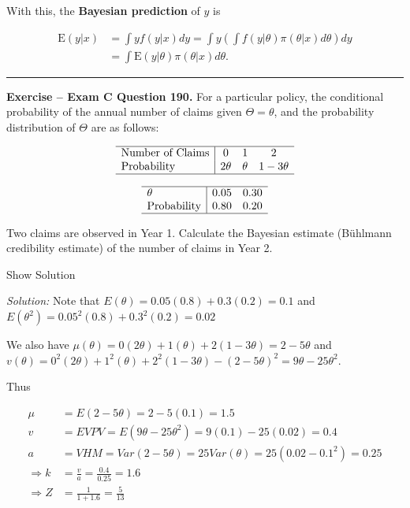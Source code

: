 \documentclass[]{book}
\theoremstyle{definition}
\theoremstyle{definition}
\theoremstyle{definition}
\theoremstyle{remark}
\begin{document}
With this, the \textbf{Bayesian prediction} of \(y\) is

\[\begin{aligned}
\mathrm{E}(y|x) &=  \int y f(y|x) dy = \int y \left(\int f(y|\theta) \pi(\theta|x) d\theta \right) dy \\
&=  \int  \mathrm{E}(y|\theta) \pi(\theta|x) d\theta .
\end{aligned}\]

\begin{center}\rule{0.5\linewidth}{\linethickness}\end{center}

\textbf{Exercise -- Exam C Question 190.} For a particular policy, the
conditional probability of the annual number of claims given
\(\Theta = \theta\), and the probability distribution of \(\Theta\) are
as follows:

\[\begin{array}{l|ccc}
\hline
\text{Number of Claims} & 0 & 1 & 2 \\
\text{Probability} & 2\theta & \theta & 1-3\theta \\
\hline
\end{array}\]

\[\begin{array}{l|cc}
\hline
\theta & 0.05 & 0.30 \\
\text{Probability} & 0.80 & 0.20 \\
\hline
\end{array}\]

Two claims are observed in Year 1. Calculate the Bayesian estimate
(Bühlmann credibility estimate) of the number of claims in Year 2.

Show Solution

\hypertarget{toggleExamC190}{}
\emph{Solution:} Note that \(E(\theta) = 0.05(0.8) + 0.3(0.2) = 0.1\)
and \(E(\theta^2) = 0.05^2(0.8) + 0.3^2(0.2)=0.02\)

We also have
\(\mu(\theta) = 0(2\theta) + 1(\theta) + 2(1-3\theta) = 2-5\theta\) and
\(v(\theta) = 0^2(2\theta) + 1^2(\theta) + 2^2(1-3\theta) - (2-5\theta)^2 = 9\theta-25\theta^2\).

Thus

\[\begin{aligned}
\mu &=  E(2-5\theta) = 2-5(0.1) = 1.5 \\
v   &=  EVPV = E(9\theta - 25\theta^2)=9(0.1)-25(0.02)=0.4 \\
a &= VHM = Var(2-5\theta) = 25Var(\theta) = 25(0.02-0.1^2) = 0.25 \\
\Rightarrow k &= \frac{v}{a} = \frac{0.4}{0.25} = 1.6 \\
\Rightarrow Z &= \frac{1}{1+1.6} = \frac{5}{13}
\end{aligned}\]
\end{document}
